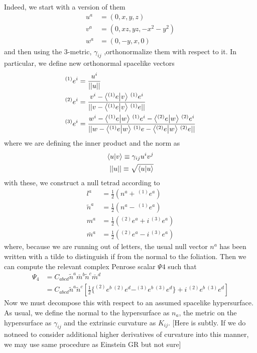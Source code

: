 \documentclass[a4paper,oneside,openany,11pt]{memoir}
\numberwithin{equation}{section} %
\newcommand{\NOTE}[1]{{\color{blue}[#1]}}
\begin{document}
Indeed, we start with a version of them
\begin{align}
u^a &= (0,x,y,z) \\
v^a &= (0,xz,yz,-x^2 - y^2) \\
w^a &= (0,-y,x,0)
\end{align}
and then using the 3-metric, $\gamma_{ij}$ ,orthonormalize them with respect to it. In particular, we define new orthonormal spacelike vectors
\begin{align}
^{(1)}e^i &= \frac{u^i}{||u||} \\
^{(2)}e^i &= \frac{v^i -  \bra{ ^{(1)}e}\ket{v} \, ^{(1)}e^i}{||v -  \bra{ ^{(1)}e}\ket{v} \, ^{(1)}e ||} \\
^{(3)}e^i &= \frac{w^i -  \bra{ ^{(1)}e}\ket{w} \, ^{(1)}e^i -  \bra{ ^{(2)}e}\ket{w} \, ^{(2)}e^i}{||w -  \bra{ ^{(1)}e}\ket{w} \, ^{(1)}e - \bra{ ^{(2)}e}\ket{w} \, ^{(2)}e ||} 
\end{align}
where we are defining the inner product and the norm as
\begin{align}
\bra{u}\ket{v} \equiv \gamma_{ij} u^i v^j \\
|| u || \equiv \sqrt{\bra{u}\ket{u}}
\end{align}
with these, we construct a null tetrad according to
\begin{align}
l^a &= \frac{1}{2} (n^a + \, ^{(1)}e^a) \\
\tilde{n}^a &= \frac{1}{2} (n^a - \, ^{(1)}e^a) \\
m^a &= \frac{1}{2} (^{(2)}e^a + i \, ^{(3)}e^a) \\
\bar{m}^a &=  \frac{1}{2} (^{(2)}e^a - i \, ^{(3)}e^a)
\end{align}
where, because we are running out of letters, the usual null vector $n^a$ has been written with a tilde to distinguish if from the normal 
to the foliation. Then we can compute the relevant complex Penrose scalar $\Psi4$ such that
\begin{align}
\Psi_4 &= C_{abcd} \tilde{n}^a \bar{m}^b \tilde{n}^c \bar{m}^d \\
           &= C_{abcd} \tilde{n}^a \tilde{n}^c \left[\frac{1}{2} \{ ^{(2)}e^b \, ^{(2)}e^d - ^{(3)}e^b \, ^{(3)}e^d  \} + i \, ^{(2)}e^b \, ^{(3)}e^d \right] 
\end{align}
Now we must decompose this with respect to an assumed spacelike hypersurface. As usual, 
we define the normal to the hypersurface as $n_a$, the metric on the hypersurface as $\gamma_{ij}$ 
and the extrinsic curvature as $K_{ij}$.
\NOTE{Here is subtly. If we do notneed to consider additional higher derivatives of curvature into this manner, we may use same procedure as Einstein GR but not sure}



	
\end{document}
